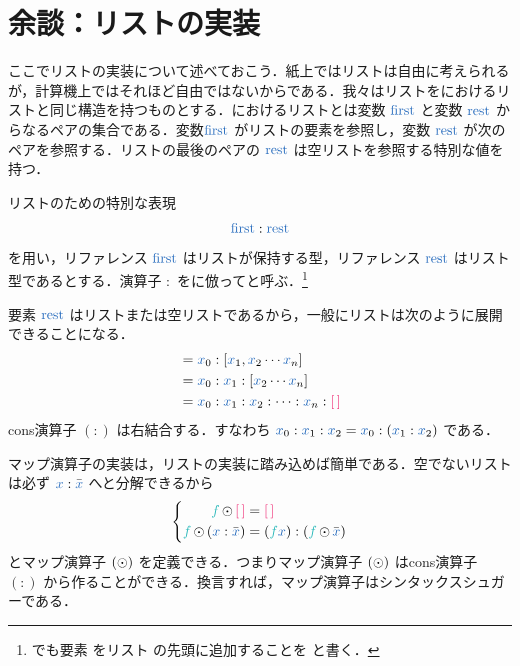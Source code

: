 \documentclass[a5paper,twoside,fleqn,draft]{jsbook}
\begin{document}
\section{余談：リストの実装}

ここでリストの実装について述べておこう．紙上ではリストは自由に考えられるが，計算機上ではそれほど自由ではないからである．我々はリストを\lisp におけるリストと同じ構造を持つものとする．\lisp におけるリストとは変数 $\mFirstVar$ と変数 $\mRestVar$ からなるペアの集合である．変数$\mFirstVar$ がリストの要素を参照し，変数 $\mRestVar$ が次のペアを参照する．リストの最後のペアの $\mRestVar$ は空リストを参照する特別な値を持つ．

リストのための特別な表現
\begin{equation}
  \mFirstVar:\mRestVar
\end{equation}
を用い，リファレンス $\mFirstVar$ はリストが保持する型，リファレンス $\mRestVar$ はリスト型であるとする．演算子 $:$ を\lisp に倣ってと呼ぶ．\footnote{\haskell でも要素  をリスト  の先頭に追加することを  と書く．}

要素 $\mRestVar$ はリストまたは空リストであるから，一般にリストは次のように展開できることになる．
\begin{align}
  [\hVar{x}_0,\hVar{x}_1,\hVar{x}_2\dotsb \hVar{x}_n]
  &=\hVar{x}_0:[\hVar{x}_1,\hVar{x}_2\dotsb \hVar{x}_n]\\
  &=\hVar{x}_0:\hVar{x}_1:[\hVar{x}_2\dotsb \hVar{x}_n]\\
  &=\hVar{x}_0:\hVar{x}_1:\hVar{x}_2:\dotsb:\hVar{x}_n:\mEmptyList
\end{align}
cons演算子 $(:)$ は右結合する．すなわち $\hVar{x}_0:\hVar{x}_1:\hVar{x}_2=\hVar{x}_0:(\hVar{x}_1:\hVar{x}_2)$ である．

マップ演算子の実装は，リストの実装に踏み込めば簡単である．空でないリストは必ず $\hVar{x}:\hListVarWith{x}$ へと分解できるから
\begin{equation}
  \left\{
  \begin{aligned}
    \hFunc{f}\mMapList\mEmptyList
    &=\mEmptyList\\
    \hFunc{f}\mMapList{}(\hVar{x}:\hListVarWith{x})
    &=(\hFunc{f}\hVar{x}):(\hFunc{f}\mMapList\hListVarWith{x})
  \end{aligned}
  \right.
\end{equation}
とマップ演算子 $(\operatorname{\odot})$ を定義できる．つまりマップ演算子 $(\operatorname{\odot})$ はcons演算子 $(:)$ から作ることができる．換言すれば，マップ演算子はシンタックスシュガーである．
\end{document}
